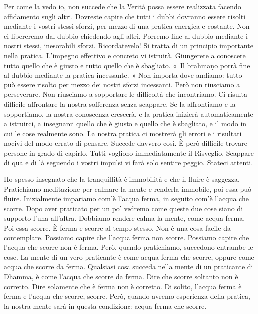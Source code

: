 Per come la vedo io, non succede che la Verità possa essere realizzata
facendo affidamento sugli altri. Dovreste capire che tutti i dubbi
dovranno essere risolti mediante i vostri stessi sforzi, per mezzo di
una pratica energica e costante. Non ci libereremo dal dubbio chiedendo
agli altri. Porremo fine al dubbio mediante i nostri stessi, inesorabili
sforzi. Ricordatevelo! Si tratta di un principio importante nella
pratica. L'impegno effettivo e concreto vi istruirà. Giungerete a
conoscere tutto quello che è giusto e tutto quello che è sbagliato. «~Il
brāhmaṇo porrà fine al dubbio mediante la pratica incessante.~» Non
importa dove andiamo: tutto può essere risolto per mezzo dei nostri
sforzi incessanti. Però non riusciamo a perseverare. Non riusciamo a
sopportare le difficoltà che incontriamo. Ci risulta difficile
affrontare la nostra sofferenza senza scappare. Se la affrontiamo e la
sopportiamo, la nostra conoscenza crescerà, e la pratica inizierà
automaticamente a istruirci, a insegnarci quello che è giusto e quello
che è sbagliato, e il modo in cui le cose realmente sono. La nostra
pratica ci mostrerà gli errori e i risultati nocivi del modo errato di
pensare. Succede davvero così. È però difficile trovare persone in grado
di capirlo. Tutti vogliono immediatamente il Risveglio. Scappare di qua
e di là seguendo i vostri impulsi vi farà solo sentire peggio. Stateci
attenti.

Ho spesso insegnato che la tranquillità è immobilità e che il fluire è
saggezza. Pratichiamo meditazione per calmare la mente e renderla
immobile, poi essa può fluire. Inizialmente impariamo com'è l'acqua
ferma, in seguito com'è l'acqua che scorre. Dopo aver praticato per un
po' vedremo come queste due cose siano di supporto l'una all'altra.
Dobbiamo rendere calma la mente, come acqua ferma. Poi essa scorre. È
ferma e scorre al tempo stesso. Non è una cosa facile da contemplare.
Possiamo capire che l'acqua ferma non scorre. Possiamo capire che
l'acqua che scorre non è ferma. Però, quando pratichiamo, succedono
entrambe le cose. La mente di un vero praticante è come acqua ferma che
scorre, oppure come acqua che scorre da ferma. Qualsiasi cosa succeda
nella mente di un praticante di Dhamma, è come l'acqua che scorre da
ferma. Dire che scorre soltanto non è corretto. Dire solamente che è
ferma non è corretto. Di solito, l'acqua ferma è ferma e l'acqua che
scorre, scorre. Però, quando avremo esperienza della pratica, la nostra
mente sarà in questa condizione: acqua ferma che scorre.

